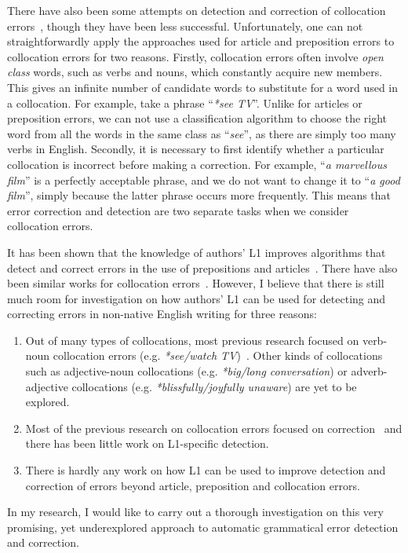 \documentclass[11pt]{article}
\begin{document}
There have also been some attempts on detection and correction of collocation errors~\citep{shei2000esl, 
wible2003bootstrapping, futagi2008computational, liu2009automated}, though they have been less successful.
Unfortunately, one can not straightforwardly apply the approaches used for article and preposition errors to collocation errors for two reasons.
Firstly, collocation errors often involve \emph{open class} words, such as verbs and nouns, which constantly acquire new members. This gives an infinite number of candidate words to substitute for a word used in a collocation. For example, take a phrase ``\emph{*see TV}''. Unlike for articles or preposition errors, we can not use a classification algorithm to choose the right word from all the words in the same class as ``\emph{see}'', as there are simply too many verbs in English.
Secondly, it is necessary to first identify whether a particular collocation is incorrect before making a correction. For example, ``\emph{a marvellous film}'' is a perfectly acceptable phrase, and we do not want to change it to ``\emph{a good film}'', simply because the latter phrase occurs more frequently. This means that error correction and detection are two separate 
tasks when we consider collocation errors.
 
It has been shown that the knowledge of authors' L1 improves algorithms that 
detect and correct errors in the use of prepositions and 
articles~\citep{rozovskaya2010generating, rozovskaya2011algorithm}. There have 
also been similar works for collocation errors~\citep{chang2008automatic, 
dahlmeier2011correcting, shei2000esl, liu2009automated}. However, I believe that 
there is still much room for investigation on how authors' L1 can be used for 
detecting and correcting errors in non-native English writing for three reasons:
\begin{enumerate}
\item Out of many 
types of collocations, most previous research focused on 
verb-noun collocation errors (e.g. \emph{*see/watch TV})~\citep{chang2008automatic, shei2000esl, 
liu2009automated}. Other kinds of collocations such as adjective-noun collocations (e.g. \emph{*big/long conversation}) or adverb-adjective collocations (e.g. \emph{*blissfully/joyfully unaware}) are yet to be explored.
\item Most of the previous research on collocation errors focused on correction~\citep{dahlmeier2011correcting, chang2008automatic} and there has been 
little work on L1-specific detection.
\item There is hardly any work on how L1 can be used to improve detection and correction of errors beyond article, preposition and collocation errors.
\end{enumerate}
In my research, I would like to carry out a thorough investigation on this very 
promising, yet underexplored approach to automatic grammatical error detection 
and correction.
\end{document}
